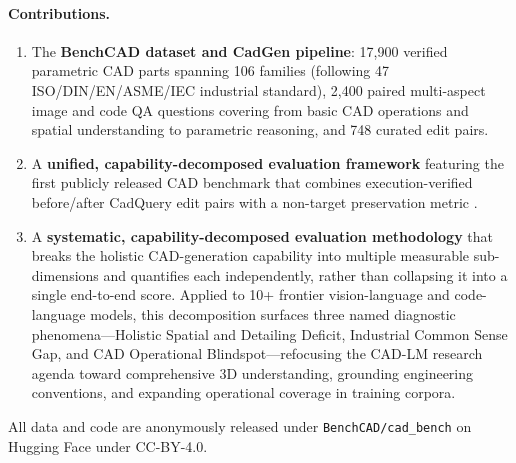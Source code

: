 \paragraph{Contributions.}
\begin{enumerate}[leftmargin=*, labelwidth=1.5em, labelsep=0.5em, topsep=-0.5em, itemsep=0em, parsep=0em]
\item The \textbf{BenchCAD dataset and CadGen pipeline}: 17{,}900 verified parametric CAD parts spanning 106 families (following 47 ISO/DIN/EN/ASME/IEC industrial standard), 2{,}400 paired multi-aspect image and code QA questions covering from basic CAD operations and spatial understanding to parametric reasoning, and 748 curated edit pairs. 
\item A \textbf{unified, capability-decomposed evaluation framework} featuring the first publicly released CAD benchmark that combines execution-verified before/after CadQuery edit pairs with a non-target preservation metric . 
\item A \textbf{systematic, capability-decomposed evaluation methodology} that breaks the holistic CAD-generation capability into multiple measurable sub-dimensions and quantifies each independently, rather than collapsing it into a single end-to-end score.
Applied to 10+ frontier vision-language and code-language models, this decomposition surfaces three named diagnostic phenomena---Holistic Spatial and Detailing Deficit, Industrial Common Sense Gap, and CAD Operational Blindspot---refocusing the CAD-LM research agenda toward comprehensive 3D understanding, grounding engineering conventions, and expanding operational coverage in training corpora.
\end{enumerate}
All data and code are anonymously released under \texttt{BenchCAD/cad\_bench} on Hugging Face under CC-BY-4.0. 
